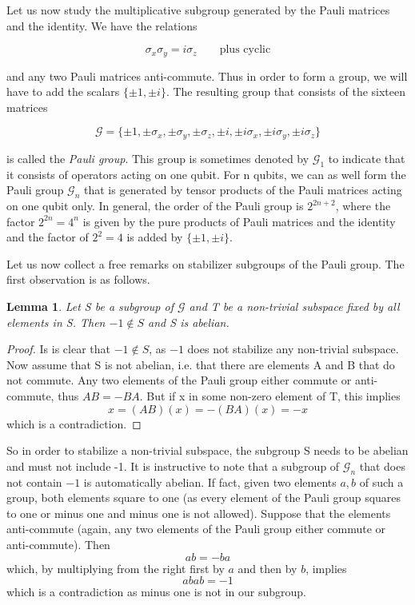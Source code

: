 \documentclass[a4paper, draft]{article}
\theoremstyle{own}
\newtheorem{lem}[thm]{Lemma}
\theoremstyle{remark}
\begin{document}
Let us now study the multiplicative subgroup generated by the Pauli matrices and the identity. We have the relations 

$$
\sigma_x \sigma_y = i \sigma_z \qquad \text{plus cyclic}
$$

and any two Pauli matrices anti-commute. Thus in order to form a group, we will have to add the scalars $\{\pm 1, \pm i\}$. The resulting group that consists of the sixteen matrices

$$
\mathcal{G} = \{
\pm 1, \pm \sigma_x, \pm \sigma_y, \pm \sigma_z, 
\pm i, \pm i \sigma_x, \pm i \sigma_y, \pm i \sigma_z 
\}          
$$

is called the \emph{Pauli group}. This group is sometimes denoted by $\mathcal{G}_1$ to indicate that it consists of operators acting on one qubit. For n qubits, we can as well form the Pauli group $\mathcal{G}_n$ that is generated by tensor products of the Pauli matrices acting on one qubit only. In general, the order of the Pauli group is $2^{2n+2}$, where the factor $2^{2n} = 4^n$ is given by the pure products of Pauli matrices and the identity and the factor of $2^2 =4$ is added by $\{\pm 1, \pm i\}$. 

Let us now collect a free remarks on stabilizer subgroups of the Pauli group. The first observation is as follows.

\begin{lem}
Let S be a subgroup of $\mathcal{G}$ and T be a non-trivial subspace fixed by all elements in S. Then $-1 \notin S$ and S is abelian.
\end{lem}

\begin{proof}
Is is clear that $-1 \notin S$, as $-1$ does not stabilize any non-trivial subspace. Now assume that S is not abelian, i.e. that there are elements A and B that do not commute. Any two elements of the Pauli group either commute or anti-commute, thus $AB = - BA$. But if x in some non-zero element of T, this implies
$$
x = (AB)(x) = - (BA)(x) = - x
$$
which is a contradiction.
\end{proof}
	
	
So in order to stabilize a non-trivial subspace, the subgroup S needs to be abelian and must not include -1. It is instructive to note that a subgroup of $\mathcal{G}_n$ that does not contain $-1$ is automatically abelian. If fact, given two elements $a, b$ of such a group, both elements square to one (as every element of the Pauli group squares to one or minus one and minus one is not allowed). Suppose that the elements anti-commute (again, any two elements of the Pauli group either commute or anti-commute). Then
$$
ab = -ba
$$
which, by multiplying from the right first by $a$ and then by $b$, implies
$$
abab = -1
$$
which is a contradiction as minus one is not in our subgroup.
\end{document}
